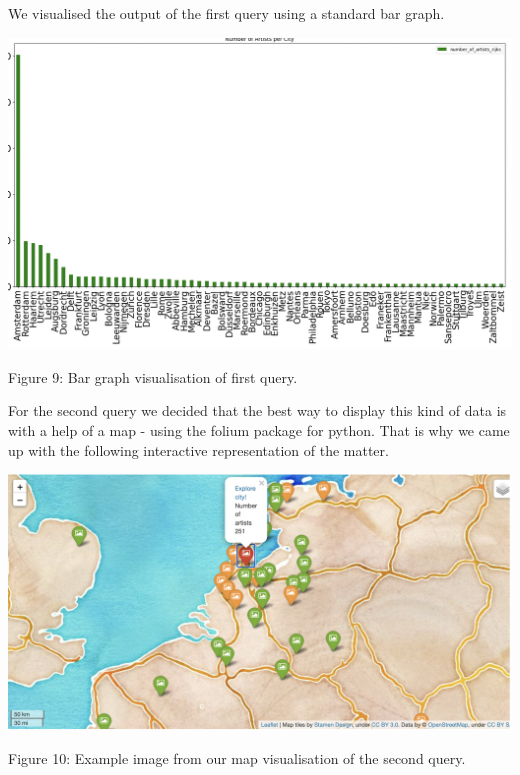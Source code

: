 \documentclass{article}
\begin{document}
We visualised the output of the first query using a standard bar graph. 

\begin{center}
\includegraphics[scale=0.4]{bonus.png}
\newline
\caption{Figure 9: Bar graph visualisation of first query.}
\end{center}

For the second query we decided that the best way to display this kind of data is with a help of a map - using the folium package for python. That is why we came up with the following interactive representation of the matter. 

\begin{center}
\includegraphics[scale=0.4]{map.png}
\newline
\caption{Figure 10: Example image from our map visualisation of the second query.}
\end{center}


\end{document}

